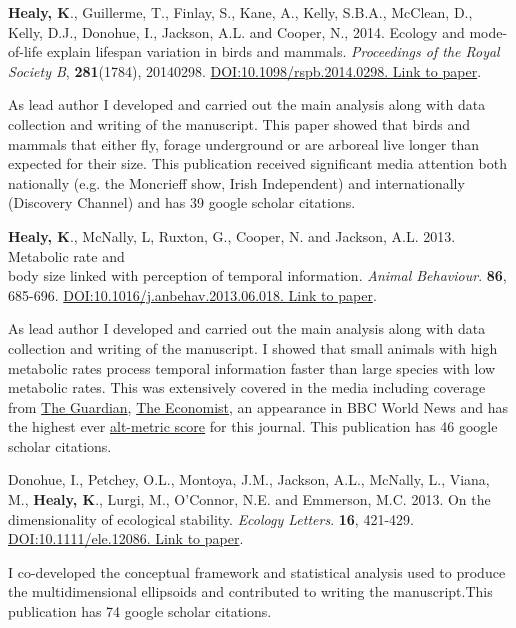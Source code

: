 \documentclass[10pt,a4paper]{article}
\begin{document}
\begin{flushleft}
\bigskip

\textbf{Healy, K}., Guillerme, T., Finlay, S., Kane, A., Kelly, S.B.A., McClean, D., Kelly, D.J., Donohue, I., Jackson, A.L. and Cooper, N., 2014. Ecology and mode-of-life explain lifespan variation in birds and mammals. \textit{Proceedings of the Royal Society B}, \textbf{281}(1784), 20140298. \href{http://rspb.royalsocietypublishing.org/content/281/1784/20140298}{DOI:10.1098/rspb.2014.0298. Link to paper}.
\smallskip
\par{\fontsize{10.5}{10} As lead author I developed and carried out the main analysis along with data collection and writing of the manuscript. This paper showed that birds and mammals that either fly, forage underground or are arboreal live longer than expected for their size. This publication received significant media attention both nationally (e.g. the Moncrieff show, Irish Independent) and internationally (Discovery Channel) and has 39 google scholar citations.}

\bigskip

\textbf{Healy, K}., McNally, L, Ruxton, G., Cooper, N. and Jackson, A.L. 2013. Metabolic rate and\\
body size linked with perception of temporal information.  \textit{Animal Behaviour}. \textbf{86}, 685-696. \href{http://dx.doi.org/10.1016/j.anbehav.2013.06.018}{DOI:10.1016/j.anbehav.2013.06.018. Link to paper}.
\smallskip
\par{\fontsize{10.5}{10} As lead author I developed and carried out the main analysis along with data collection and writing of the manuscript. I showed that small animals with high metabolic rates process temporal information faster than large species with low metabolic rates. This was extensively covered in the media including coverage from 
\href{https://www.theguardian.com/science/2013/sep/16/time-passes-slowly-flies-study}{The Guardian}, 
\href{http://www.economist.com/news/science-and-technology/21586532-small-creatures-fast-metabolisms-see-world-action-replay-slo-mo}{The Economist},
 an appearance in BBC World News and has the highest ever \href{http://www.altmetric.com/details.php?key=517059da36b98ab7d4941284da32e5f7&citation_id=1705703&embedded=true}{alt-metric score} for this journal. This publication has 46 google scholar citations.} 

\bigskip

\setlength{\parindent}{0mm}Donohue, I., Petchey, O.L., Montoya, J.M., Jackson, A.L., McNally, L., Viana, M., \textbf{Healy, K}., Lurgi, M., O’Connor, N.E. and Emmerson, M.C. 2013. On the dimensionality of ecological stability. \textit{Ecology Letters}. \textbf{16}, 421-429. \href{http://onlinelibrary.wiley.com/doi/10.1111/ele.12086/abstract} {DOI:10.1111/ele.12086. Link to paper}. 
\smallskip
\par{\fontsize{10.5}{10} I co-developed the conceptual framework and statistical analysis used to produce the multidimensional ellipsoids and contributed to writing the manuscript.This publication has 74 google scholar citations.}
\bigskip



\end{flushleft}
\end{document}
